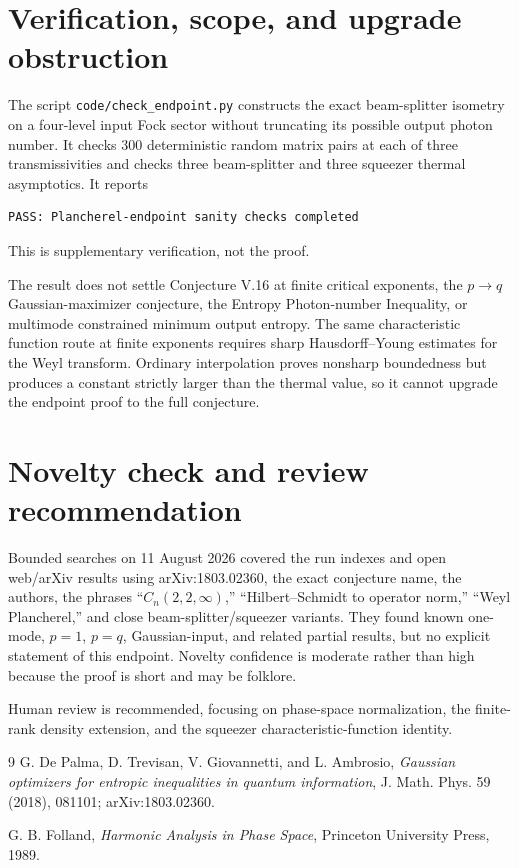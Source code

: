 \documentclass[11pt]{article}
\begin{document}
\section{Verification, scope, and upgrade obstruction}

The script \texttt{code/check\_endpoint.py} constructs the exact beam-splitter
isometry on a four-level input Fock sector without truncating its possible
output photon number.  It checks 300 deterministic random matrix pairs at each
of three transmissivities and checks three beam-splitter and three squeezer
thermal asymptotics.  It reports
\begin{verbatim}
PASS: Plancherel-endpoint sanity checks completed
\end{verbatim}
This is supplementary verification, not the proof.

The result does not settle Conjecture V.16 at finite critical exponents, the
$p\to q$ Gaussian-maximizer conjecture, the Entropy Photon-number Inequality,
or multimode constrained minimum output entropy.  The same characteristic
function route at finite exponents requires sharp Hausdorff--Young estimates
for the Weyl transform.  Ordinary interpolation proves nonsharp boundedness
but produces a constant strictly larger than the thermal value, so it cannot
upgrade the endpoint proof to the full conjecture.

\section{Novelty check and review recommendation}

Bounded searches on 11 August 2026 covered the run indexes and open web/arXiv
results using arXiv:1803.02360, the exact conjecture name, the authors, the
phrases ``$C_n(2,2,\infty)$,'' ``Hilbert--Schmidt to operator norm,'' ``Weyl
Plancherel,'' and close beam-splitter/squeezer variants.  They found known
one-mode, $p=1$, $p=q$, Gaussian-input, and related partial results, but no
explicit statement of this endpoint.  Novelty confidence is moderate rather
than high because the proof is short and may be folklore.

Human review is recommended, focusing on phase-space normalization, the
finite-rank density extension, and the squeezer characteristic-function
identity.

\begin{thebibliography}{9}
G. De Palma, D. Trevisan, V. Giovannetti, and L. Ambrosio,
\emph{Gaussian optimizers for entropic inequalities in quantum information},
J. Math. Phys. 59 (2018), 081101; arXiv:1803.02360.

G. B. Folland,
\emph{Harmonic Analysis in Phase Space},
Princeton University Press, 1989.
\end{thebibliography}
\end{document}
